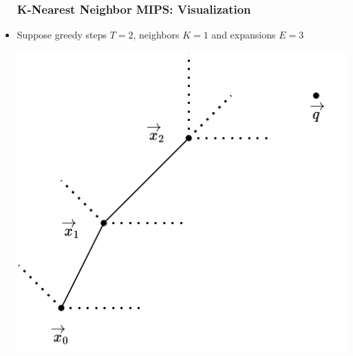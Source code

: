 \documentclass{beamer}
\begin{document}
\begin{frame}[fragile]
\begin{itemize}
\frametitle{K-Nearest Neighbor MIPS: Visualization}

\item Suppose greedy steps $T = 2$, neighbors $K = 1$ and expansions $E = 3$

\vspace{0.4cm}

\begin{minipage}[c]{0.5\textwidth}
    \hspace{2.5cm}
    \includegraphics[width=\linewidth]{GNN/imgs/KNN-MIPSDRAW.pdf}
\end{minipage}

\end{itemize}
\end{frame}

\end{document}
